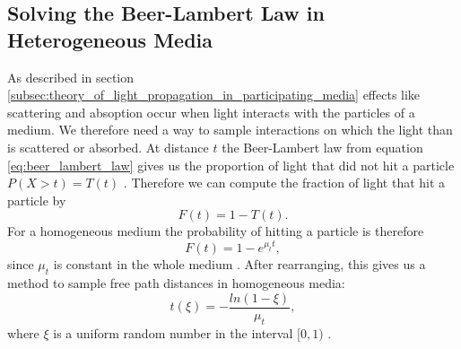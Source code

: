 \subsection{Solving the Beer-Lambert Law in Heterogeneous Media}
\label{subsec:solving_beer_lambert_law_in_heterogeneous_media}
As described in section \ref{subsec:theory_of_light_propagation_in_participating_media} effects like scattering and absoption occur when light interacts with the particles of a medium.
We therefore need a way to sample interactions on which the light than is scattered or absorbed.
At distance $t$ the Beer-Lambert law from equation \ref{eq:beer_lambert_law} gives us the proportion of light that did not hit a particle $P(X > t) = T(t)$ \cite{novak_overview}.
Therefore we can compute the fraction of light that hit a particle by \cite{novak_overview}
\begin{equation}
    F(t) = 1 - T(t).
\end{equation}
For a homogeneous medium the probability of hitting a particle is therefore
\begin{equation}
    F(t) = 1 - e^{\mu_t t},
\end{equation}
since $\mu_t$ is constant in the whole medium \cite{novak_overview}.
After rearranging, this gives us a method to sample free path distances in homogeneous media:
\begin{equation}
    \label{eq:distance_sampling}
    t(\xi) = -\frac{ln(1-\xi)}{\mu_t},
\end{equation}
where $\xi$ is a uniform random number in the interval $[0, 1)$ \cite{novak_overview}.

